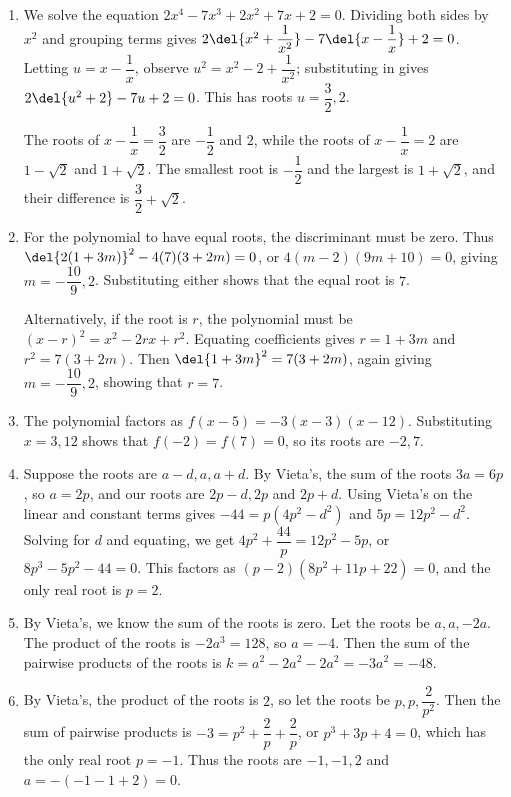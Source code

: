 \documentclass[10pt,paper=letter]{scrartcl}
\begin{document}
\begin{enumerate}

\item We solve the equation $2x^4 - 7x^3 + 2x^2 + 7x + 2 = 0$. Dividing both sides by $x^2$ and grouping terms gives $2\del{x^2 + \dfrac1{x^2}} - 7\del{x - \dfrac1x} + 2 = 0$. Letting $u = x - \dfrac1x$, observe $u^2 = x^2 - 2 + \dfrac1{x^2}$; substituting in gives $2\del{u^2 + 2} - 7u + 2 = 0$. This has roots $u = \dfrac32, 2$. 

The roots of $x - \dfrac1x = \dfrac32$ are $-\dfrac12$ and $2$, while the roots of $x - \dfrac1x = 2$ are $1 - \sqrt2$ and $1 + \sqrt2$. The smallest root is $-\dfrac12$ and the largest is $1 + \sqrt2$, and their difference is $\dfrac32 + \sqrt2$.

\item For the polynomial to have equal roots, the discriminant must be zero. Thus $\del{2(1+3m)}^2 - 4(7)(3 + 2m) = 0$, or $4(m-2)(9m + 10) = 0$, giving $m = -\dfrac{10}9, 2$. Substituting either shows that the equal root is $7$.

Alternatively, if the root is $r$, the polynomial must be $(x - r)^2 = x^2 - 2rx + r^2$. Equating coefficients gives $r = 1 + 3m$ and $r^2 = 7(3 + 2m)$. Then $\del{1 + 3m}^2 = 7(3 + 2m)$, again giving $m = -\dfrac{10}9, 2$, showing that $r = 7$.

\item The polynomial factors as $f(x-5) = -3(x-3)(x-12)$. Substituting $x = 3, 12$ shows that $f(-2) = f(7) = 0$, so its roots are $-2, 7$.

\item Suppose the roots are $a - d, a, a + d$. By Vieta's, the sum of the roots $3a = 6p$, so $a = 2p$, and our roots are $2p - d, 2p$ and $2p + d$. Using Vieta's on the linear and constant terms gives $-44 = p(4p^2 - d^2)$ and $5p = 12p^2 - d^2$. Solving for $d$ and equating, we get $4p^2 + \dfrac{44}p = 12p^2 - 5p$, or $8p^3 - 5p^2 - 44 = 0$. This factors as $(p-2)(8p^2 + 11p + 22) = 0$, and the only real root is $p = 2$.

\item By Vieta's, we know the sum of the roots is zero. Let the roots be $a, a, -2a$. The product of the roots is $-2a^3 = 128$, so $a = -4$. Then the sum of the pairwise products of the roots is $k = a^2 - 2a^2 - 2a^2 = -3a^2 = -48$.

\item By Vieta's, the product of the roots is $2$, so let the roots be $p, p, \dfrac2{p^2}$. Then the sum of pairwise products is $-3 = p^2 + \dfrac2p + \dfrac2p$, or $p^3 + 3p + 4 = 0$, which has the only real root $p = -1$. Thus the roots are $-1, -1, 2$ and $a = -(-1 -1 + 2) = 0$.

\end{enumerate}
\end{document}
